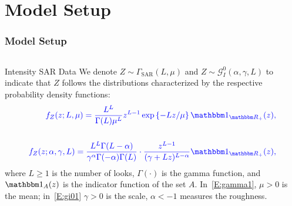 \documentclass[aspectratio=1610,10pt]{beamer}
\begin{document}
\section{Model Setup}
\begin{frame} \frametitle{\large{Model Setup}}\vspace{0.4cm}	

 \justifying
\begin{columns}[T,onlytextwidth]
    \begin{column}{.99\textwidth}
			\begin{exampleblock}{Intensity SAR Data}\vspace{0.4cm}	
			\justifying
We denote
\(Z \sim \Gamma_{\text{SAR}}(L, \mu)\) and
\(Z \sim \mathcal{G}_I^0(\alpha, \gamma, L)\) to indicate that \(Z\)
follows the distributions characterized by the respective probability
density functions:
\begin{align}%
 \textcolor[rgb]{0,0,1}{f_Z(z;L, \mu)=\frac{L^L}{\Gamma(L)\mu^L}z^{L-1}\exp\left\{-Lz/\mu\right\} \mathbbm 1_{\mathbbm R_+}(z), \label{E:gamma1}}\\ \nonumber\\
\textcolor[rgb]{0,0,1}{f_Z(z; \alpha, \gamma, L)=\frac{L^L\Gamma(L-\alpha)}{\gamma^{\alpha}\Gamma(-\alpha)\Gamma(L)}\cdot\frac{z^{L-1}}{(\gamma+Lz)^{L-\alpha}} \mathbbm 1_{\mathbbm R_+}(z),\label{E:gi01}}    
\end{align}
where \(L \geq 1\) is the number of looks, \(\Gamma(\cdot)\)
is the gamma function, and \(\mathbbm 1_{A}(z)\) is the indicator
function of the set \(A\). 
In~\eqref{E:gamma1}, \(\mu > 0\) is the mean;
in~\eqref{E:gi01} \(\gamma > 0\) is the scale, \(\alpha < -1\) measures
the roughness.
	\end{exampleblock}
	\
		
    \end{column}
    
\end{columns}\vspace{0.2cm}


\end{frame} 
\end{document}
